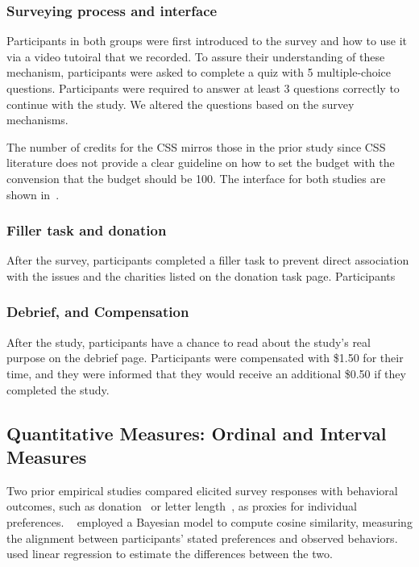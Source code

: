 \subsubsection{Surveying process and interface}
Participants in both groups were first introduced to the survey and how to use it via a video tutoiral that we recorded. To assure their understanding of these mechanism, participants were asked to complete a quiz with 5 multiple-choice questions. Participants were required to answer at least 3 questions correctly to continue with the study. We altered the questions based on the survey mechanisms.

The number of credits for the CSS mirros those in the prior study since CSS literature does not provide a clear guideline on how to set the budget with the convension that the budget should be 100. The interface for both studies are shown in~.

\subsubsection{Filler task and donation}
After the survey, participants completed a filler task to prevent direct association with the issues and the charities listed on the donation task page. Participants 

\subsubsection{Debrief, and Compensation}
After the study, participants have a chance to read about the study's real purpose on the debrief page. Participants were compensated with \$1.50 for their time, and they were informed that they would receive an additional \$0.50 if they completed the study.

\subsection{Quantitative Measures: Ordinal and Interval Measures}
\label{sec:quantitative_measures}
Two prior empirical studies compared elicited survey responses with behavioral outcomes, such as donation~\cite{chengCanShowWhat2021,cavaille2024cares} or letter length~\cite{cavaille2024cares}, as proxies for individual preferences. ~\citet{chengCanShowWhat2021} employed a Bayesian model to compute cosine similarity, measuring the alignment between participants' stated preferences and observed behaviors. ~\citet{cavaille2024cares} used linear regression to estimate the differences between the two.

